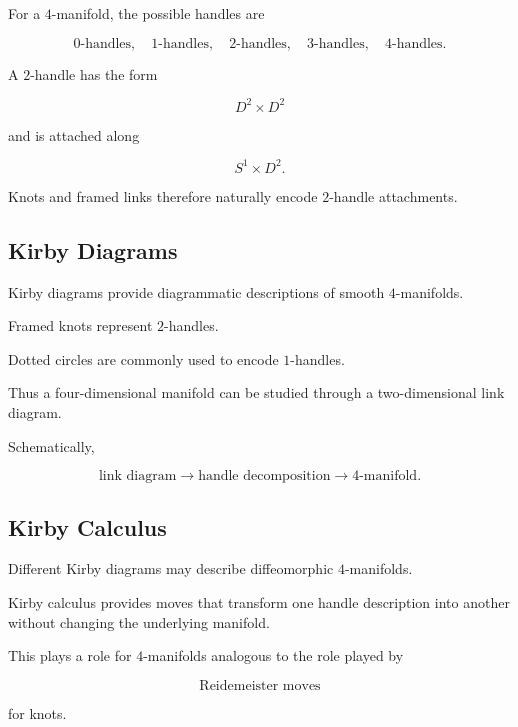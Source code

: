 For a \(4\)-manifold, the possible handles are

\[
\boxed{
0\text{-handles},
\quad
1\text{-handles},
\quad
2\text{-handles},
\quad
3\text{-handles},
\quad
4\text{-handles}.
}
\]

A \(2\)-handle has the form

\[
\boxed{
D^2\times D^2
}
\]

and is attached along

\[
\boxed{
S^1\times D^2.
}
\]

Knots and framed links therefore naturally encode \(2\)-handle attachments.

\subsection{Kirby Diagrams}
\label{subsec:kirby-diagrams}

Kirby diagrams provide diagrammatic descriptions of smooth \(4\)-manifolds.

Framed knots represent \(2\)-handles.

Dotted circles are commonly used to encode \(1\)-handles.

Thus a four-dimensional manifold can be studied through a two-dimensional
link diagram.

Schematically,

\[
\boxed{
\text{link diagram}
\longrightarrow
\text{handle decomposition}
\longrightarrow
4\text{-manifold}.
}
\]

\subsection{Kirby Calculus}
\label{subsec:kirby-calculus}

Different Kirby diagrams may describe diffeomorphic \(4\)-manifolds.

Kirby calculus provides moves that transform one handle description into
another without changing the underlying manifold.

This plays a role for \(4\)-manifolds analogous to the role played by

\[
\boxed{
\text{Reidemeister moves}
}
\]

for knots.

